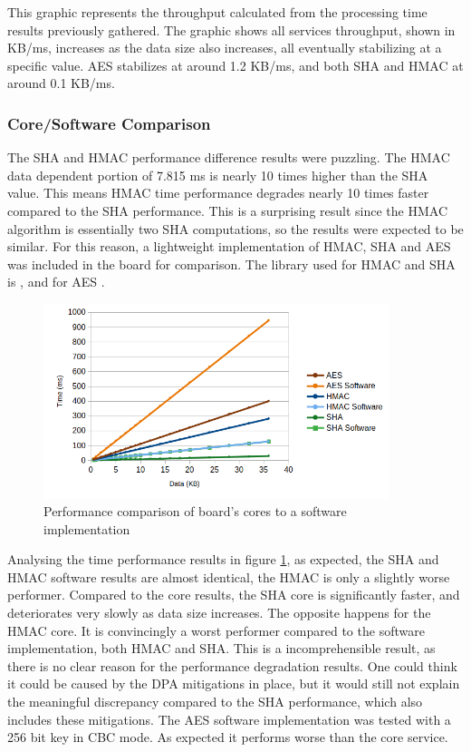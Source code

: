 This graphic represents the throughput calculated from the processing time results previously gathered. The graphic shows all services throughput, shown in KB/ms, increases as the data size also increases, all eventually stabilizing at a specific value. \ac{AES} stabilizes at around 1.2 KB/ms, and both \ac{SHA} and \ac{HMAC} at around 0.1 KB/ms.

\subsubsection{Core/Software Comparison}\label{chap:evaluation:services:software}

The SHA and HMAC performance difference results were puzzling. The HMAC data dependent portion of 7.815 ms is nearly 10 times higher than the SHA value. This means HMAC time performance degrades nearly 10 times faster compared to the SHA performance. This is a surprising result since the HMAC algorithm is essentially two SHA computations, so the results were expected to be similar.
For this reason, a lightweight implementation of HMAC, SHA and AES was included in the board for comparison. The library used for HMAC and SHA is \cite{ogayHMAC}, and for AES \cite{tinycrypt}. 

\begin{figure}[h!]
	\centering
	\includegraphics[width=0.9\textwidth]{./Images/software-core-time.png}
	\caption{Performance comparison of board's cores to a software implementation}
	\label{fig:performance:software-core-time}
\end{figure}

Analysing the time performance results in figure \ref{fig:performance:software-core-time}, as expected, the SHA and HMAC software results are almost identical, the HMAC is only a slightly worse performer. Compared to the core results, the SHA core is significantly faster, and deteriorates very slowly as data size increases. The opposite happens for the HMAC core. It is convincingly a worst performer compared to the software implementation, both HMAC and SHA. 
This is a incomprehensible result, as there is no clear reason for the performance degradation results. One could think it could be caused by the \ac{DPA} mitigations in place, but it would still not explain the meaningful discrepancy compared to the SHA performance, which also includes these mitigations.
The AES software implementation was tested with a 256 bit key in CBC mode. As expected it performs worse than the core service.


